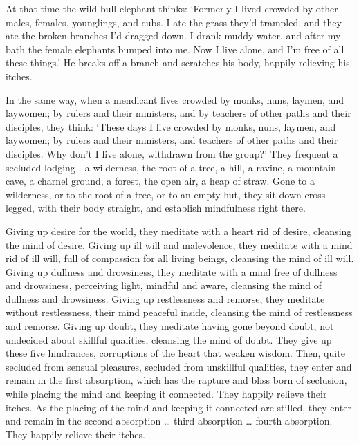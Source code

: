 \documentclass[12pt,openany]{book}%
\begin{document}
At that time the wild bull elephant thinks: ‘Formerly I lived crowded by other males, females, younglings, and cubs. I ate the grass they’d trampled, and they ate the broken branches I’d dragged down. I drank muddy water, and after my bath the female elephants bumped into me. Now I live alone, and I’m free of all these things.’ He breaks off a branch and scratches his body, happily relieving his itches. 

In the same way, when a mendicant lives crowded by monks, nuns, laymen, and laywomen; by rulers and their ministers, and by teachers of other paths and their disciples, they think: ‘These days I live crowded by monks, nuns, laymen, and laywomen; by rulers and their ministers, and teachers of other paths and their disciples. Why don’t I live alone, withdrawn from the group?’ They frequent a secluded lodging—a wilderness, the root of a tree, a hill, a ravine, a mountain cave, a charnel ground, a forest, the open air, a heap of straw. Gone to a wilderness, or to the root of a tree, or to an empty hut, they sit down cross-legged, with their body straight, and establish mindfulness right there. 

Giving up desire for the world, they meditate with a heart rid of desire, cleansing the mind of desire. Giving up ill will and malevolence, they meditate with a mind rid of ill will, full of compassion for all living beings, cleansing the mind of ill will. Giving up dullness and drowsiness, they meditate with a mind free of dullness and drowsiness, perceiving light, mindful and aware, cleansing the mind of dullness and drowsiness. Giving up restlessness and remorse, they meditate without restlessness, their mind peaceful inside, cleansing the mind of restlessness and remorse. Giving up doubt, they meditate having gone beyond doubt, not undecided about skillful qualities, cleansing the mind of doubt. They give up these five hindrances, corruptions of the heart that weaken wisdom. Then, quite secluded from sensual pleasures, secluded from unskillful qualities, they enter and remain in the first absorption, which has the rapture and bliss born of seclusion, while placing the mind and keeping it connected. They happily relieve their itches. As the placing of the mind and keeping it connected are stilled, they enter and remain in the second absorption … third absorption … fourth absorption. They happily relieve their itches. 
\end{document}
